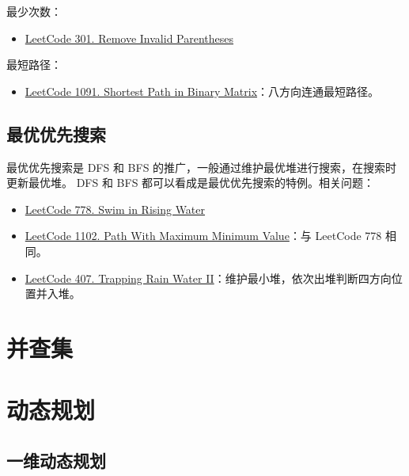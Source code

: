最少次数：
\begin{itemize}
  \item
    \href{https://leetcode.com/problems/remove-invalid-parentheses/}{LeetCode 301. Remove Invalid Parentheses}
\end{itemize}

最短路径：
\begin{itemize}
  \item
    \href{https://leetcode.com/problems/shortest-path-in-binary-matrix/}{LeetCode
      1091. Shortest Path in Binary Matrix}：八方向连通最短路径。
\end{itemize}

\subsection{最优优先搜索}
最优优先搜索是 DFS 和 BFS 的推广，一般通过维护最优堆进行搜索，在搜索时更新最优堆。
DFS 和 BFS 都可以看成是最优优先搜索的特例。相关问题：

\begin{itemize}
  \item
    \href{https://leetcode.com/problems/swim-in-rising-water/}{LeetCode 778. Swim in Rising Water}
  \item
    \href{https://leetcode.com/problems/path-with-maximum-minimum-value}{LeetCode
      1102. Path With Maximum Minimum Value}：与 LeetCode 778 相同。
  \item
    \href{https://leetcode.com/problems/trapping-rain-water-ii/}{LeetCode 407.
      Trapping Rain Water II}：维护最小堆，依次出堆判断四方向位置并入堆。
\end{itemize}


\section{并查集}

\section{动态规划}

\subsection{一维动态规划}

